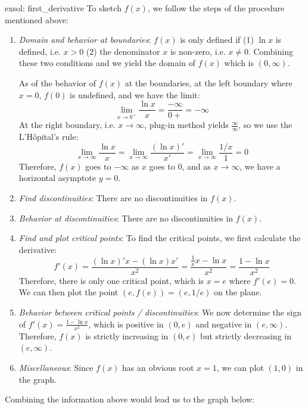 \begin{exsol}[]{exsol: first_derivative}
    To sketch $f(x)$, we follow the steps of the procedure mentioned above:
    
    \begin{enumerate}
        \item \textit{Domain and behavior at boundaries}: $f(x)$ is only defined if (1) $\ln x$ is defined, i.e. $x > 0$ (2) the denominator $x$ is non-zero, i.e. $x \ne 0$.  Combining these two conditions and we yield the domain of $f(x)$ which is $(0, \infty)$.
        
        As of the behavior of $f(x)$ at the boundaries, at the left boundary where $x=0$, $f(0)$ is undefined, and we have the limit:
        \[\lim_{x\rightarrow 0^+} \frac{\ln x}{x} = \frac{-\infty}{0+} = -\infty\]
        At the right boundary, i.e. $x \rightarrow \infty$, plug-in method yields $\frac{\infty}{\infty}$, so we use the L'Hôpital's rule:
        \[\lim_{x\rightarrow \infty} \frac{\ln x}{x} = \lim_{x\rightarrow \infty} \frac{(\ln x)'}{x'} = \lim_{x\rightarrow \infty} \frac{1/x}{1} = 0\]
        Therefore, $f(x)$ goes to $-\infty$ as $x$ goes to $0$, and as $x \rightarrow \infty$, we have a horizontal asymptote $y = 0$.
        \item \textit{Find discontinuities}: There are no discontinuities in $f(x)$.
        \item \textit{Behavior at discontinuities}: There are no discontinuities in $f(x)$.
        \item \textit{Find and plot critical points}: To find the critical points, we first calculate the derivative:
        \[f'(x) = \frac{(\ln x)'x - (\ln x)x'}{x^2} = \frac{\frac{1}{x}x - \ln x}{x^2} = \frac{1-\ln x}{x^2}\]
        Therefore, there is only one critical point, which is $x = e$ where $f'(e) = 0$.  We can then plot the point $(e,f(e)) = (e,1/e)$ on the plane.
        \item \textit{Behavior between critical points / discontinuities}: We now determine the sign of $f'(x) = \frac{1-\ln x}{x^2}$, which is positive in $(0, e)$ and negative in $(e, \infty)$.  Therefore, $f(x)$ is strictly increasing in $(0, e)$ but strictly decreasing in $(e, \infty)$.
        \item \textit{Miscellaneous}: Since $f(x)$ has an obvious root $x=1$, we can plot $(1,0)$ in the graph.
    \end{enumerate}

    Combining the information above would lead us to the graph below:
    
    \begin{center}
        \label{fig: ex_first_derivative}
    \end{center}
\end{exsol}

